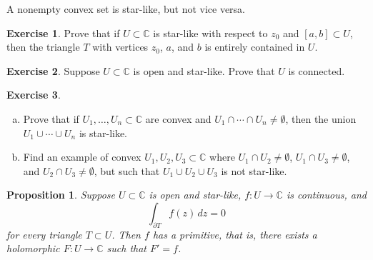 \documentclass[12pt,openany]{book}
\newcommand{\C}{{\mathbb{C}}}
\theoremstyle{plain}
\newtheorem{prop}[thm]{Proposition}
\theoremstyle{remark}
\theoremstyle{definition}
\newenvironment{exbox}{%
    \def\FrameCommand{\vrule width 1pt \relax\hspace{10pt}}%
    \MakeFramed{\advance\hsize-\width\FrameRestore}%
}{%
    \endMakeFramed
}
\newenvironment{exparts}{%
    \leavevmode\begin{enumerate}[a),noitemsep,topsep=0pt,parsep=0pt,partopsep=0pt]
}{%
    \end{enumerate}
}
\theoremstyle{exercise}
\newtheorem{exercise}{Exercise}[section]
\theoremstyle{example}
\begin{document}
A nonempty convex set is star-like, but not vice versa.

\begin{exbox}
\begin{exercise}%
\label{exercise:triangleinstarlike}
Prove that if $U \subset \C$ is star-like with respect to $z_0$ and $[a,b]
\subset U$, then the triangle $T$ with vertices $z_0$, $a$, and $b$ is entirely
contained in $U$.
\end{exercise}

\begin{exercise}
Suppose $U \subset \C$ is open and star-like.  Prove that $U$ is connected.
\end{exercise}

\begin{exercise}
\begin{exparts}
\item
Prove that if $U_1,\ldots,U_n \subset \C$ are convex and $U_1 \cap 
\cdots \cap U_n \neq \emptyset$, then the union $U_1 \cup \cdots \cup U_n$
is star-like.
\item
Find an example of convex $U_1,U_2,U_3 \subset \C$ where
$U_1 \cap U_2 \neq \emptyset$,
$U_1 \cap U_3 \neq \emptyset$, and
$U_2 \cap U_3 \neq \emptyset$, but such that $U_1 \cup U_2 \cup U_3$
is not star-like.
\end{exparts}
\end{exercise}
\end{exbox}

\begin{prop} \label{prop:primitiveinstarlike1}
Suppose $U \subset \C$ is open and star-like,
$f \colon U \to \C$ is continuous, and
\begin{equation*}
\int_{\partial T} f(z) \, dz = 0
\end{equation*}
for every triangle $T \subset U$.
Then $f$ has a primitive, that is,
there exists a holomorphic $F \colon U \to \C$
such that $F' = f$.
\end{prop}
\end{document}
